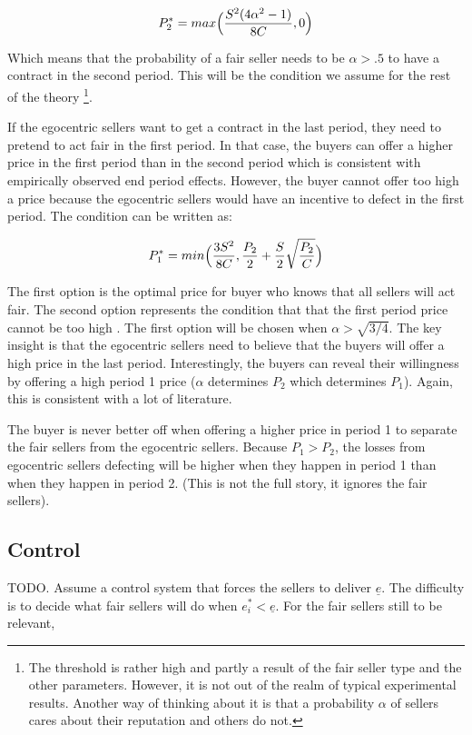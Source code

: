 \documentclass{article}
\begin{document}
$$
P^*_2 = max \Bigl( \frac{S^2 (4\alpha^2 - 1)}{8C}, 0 \Bigr )
$$

Which means that the probability of a fair seller needs to be $\alpha > .5$ to have a contract in the second period. This will be the condition we assume for the rest of the theory \footnote{The threshold is rather high and partly a result of the fair seller type and the other parameters. However, it is not out of the realm of typical experimental results. Another way of thinking about it is that a probability $\alpha$ of sellers cares about their reputation and others do not.}.

If the egocentric sellers want to get a contract in the last period, they need to pretend to act fair in the first period. In that case, the buyers can offer a higher price in the first period than in the second period which is consistent with empirically observed end period effects. However, the buyer cannot offer too high a price because the egocentric sellers would have an incentive to defect in the first period. The condition can be written as:

$$
P^*_1 = min \Bigl ( \frac{3 S^2}{8C},
           \frac{P_2}{2} + \frac{S}{2} \sqrt{\frac{P_2}{C}} \Bigr )
$$

The first option is the optimal price for buyer who knows that all sellers will act fair. The second option represents the condition that that the first period price cannot be too high . The first option will be chosen when $\alpha > \sqrt{3/4}$. The key insight is that the egocentric sellers need to believe that the buyers will offer a high price in the last period. Interestingly, the buyers can reveal their willingness by offering a high period 1 price ($\alpha$ determines $P_2$ which determines $P_1$). Again, this is consistent with a lot of literature. 

The buyer is never better off when offering a higher price in period 1 to separate the fair sellers from the egocentric sellers. Because $P_1 > P_2$, the losses from egocentric sellers defecting will be higher when they happen in period 1 than when they happen in period 2. (This is not the full story, it ignores the fair sellers).

\subsection{Control}

TODO. Assume a control system that forces the sellers to deliver $\underline{e}$. The difficulty is to decide what fair sellers will do when $e^*_i < \underline{e}$. For the fair sellers still to be relevant, 
\end{document}
